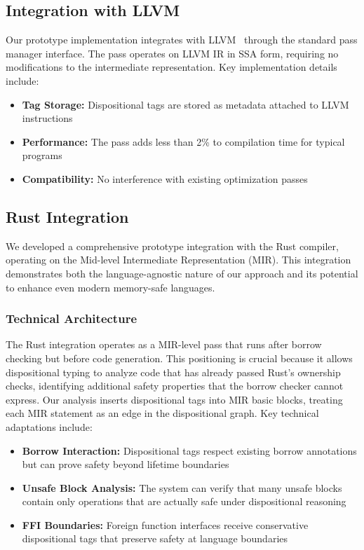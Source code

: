 \documentclass[acmsmall,anonymous,review,screen]{acmart}
\begin{document}
	\subsection{Integration with LLVM}
	
	Our prototype implementation integrates with LLVM~\cite{lattner2004llvm} through the standard pass manager interface. The pass operates on LLVM IR in SSA form, requiring no modifications to the intermediate representation. Key implementation details include:
	\begin{itemize}
		\item \textbf{Tag Storage:} Dispositional tags are stored as metadata attached to LLVM instructions
		\item \textbf{Performance:} The pass adds less than 2\% to compilation time for typical programs  
		\item \textbf{Compatibility:} No interference with existing optimization passes
	\end{itemize}
	
	\subsection{Rust Integration}
	
	We developed a comprehensive prototype integration with the Rust compiler, operating on the Mid-level Intermediate Representation (MIR). This integration demonstrates both the language-agnostic nature of our approach and its potential to enhance even modern memory-safe languages.
	
	\subsubsection{Technical Architecture}
	The Rust integration operates as a MIR-level pass that runs after borrow checking but before code generation. This positioning is crucial because it allows dispositional typing to analyze code that has already passed Rust's ownership checks, identifying additional safety properties that the borrow checker cannot express. Our analysis inserts dispositional tags into MIR basic blocks, treating each MIR statement as an edge in the dispositional graph. Key technical adaptations include:
	\begin{itemize}
		\item \textbf{Borrow Interaction:} Dispositional tags respect existing borrow annotations but can prove safety beyond lifetime boundaries
		\item \textbf{Unsafe Block Analysis:} The system can verify that many unsafe blocks contain only operations that are actually safe under dispositional reasoning
		\item \textbf{FFI Boundaries:} Foreign function interfaces receive conservative dispositional tags that preserve safety at language boundaries
	\end{itemize}
	
\end{document}

